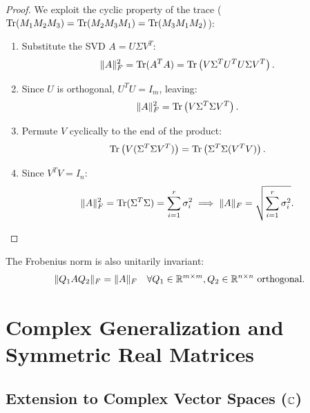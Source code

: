 \begin{proof}
We exploit the cyclic property of the trace ($\operatorname{Tr}(M_1 M_2 M_3) = \operatorname{Tr}(M_2 M_3 M_1) = \operatorname{Tr}(M_3 M_1 M_2)$):
\begin{enumerate}
    \item Substitute the SVD $A = U \Sigma V^T$:
    \begin{equation}
        \|A\|_F^2 = \operatorname{Tr}(A^T A) = \operatorname{Tr}\left( V \Sigma^T U^T U \Sigma V^T \right).
    \end{equation}
    \item Since $U$ is orthogonal, $U^T U = I_m$, leaving:
    \begin{equation}
        \|A\|_F^2 = \operatorname{Tr}\left( V \Sigma^T \Sigma V^T \right).
    \end{equation}
    \item Permute $V$ cyclically to the end of the product:
    \begin{equation}
        \operatorname{Tr}\left( V (\Sigma^T \Sigma V^T) \right) = \operatorname{Tr}\left( \Sigma^T \Sigma (V^T V) \right).
    \end{equation}
    \item Since $V^T V = I_n$:
    \begin{equation}
        \|A\|_F^2 = \operatorname{Tr}(\Sigma^T \Sigma) = \sum_{i=1}^r \sigma_i^2 \implies \|A\|_F = \sqrt{\sum_{i=1}^r \sigma_i^2}.
    \end{equation}
\end{enumerate}
\end{proof}

\begin{corollary}
The Frobenius norm is also unitarily invariant:
\begin{equation}
    \|Q_1 A Q_2\|_F = \|A\|_F \quad \forall Q_1 \in \mathbb{R}^{m \times m}, Q_2 \in \mathbb{R}^{n \times n} \text{ orthogonal}.
\end{equation}
\end{corollary}

\FloatBarrier
\section{Complex Generalization and Symmetric Real Matrices}
\label{sec:complex-symmetric-matrices-en}

\subsection{Extension to Complex Vector Spaces ($\mathbb{C}$)}

